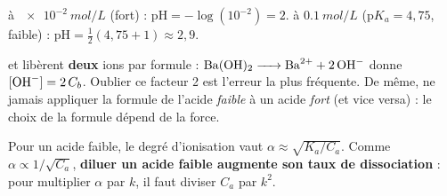 \documentclass[11pt,a4paper]{article}
\begin{document}
\begin{exemplebox}
 à $\qty{e-2}{mol\per L}$ (fort) : $\mathrm{pH} = -\log(10^{-2}) = 2$.\quad\quad
{} à $\qty{0,1}{mol\per L}$ ($\mathrm{p}K_a = 4{,}75$, faible) :
$\mathrm{pH} = \tfrac12(4{,}75 + 1) \approx 2{,}9$.
\end{exemplebox}

\begin{piege}
 et  libèrent \textbf{deux} ions par formule :
$\ce{Ba(OH)2 -> Ba^{2+} + 2 OH-}$ donne $[\ce{OH-}] = 2\,C_b$. Oublier ce facteur \num{2} est l'erreur la plus
fréquente. De même, ne jamais appliquer la formule de l'acide \emph{faible} à un acide \emph{fort} (et vice
versa) : le choix de la formule dépend de la force.
\end{piege}

\begin{remarque}
Pour un acide faible, le degré d'ionisation vaut $\alpha \approx \sqrt{K_a/C_a}$. Comme $\alpha \propto
1/\sqrt{C_a}$, \textbf{diluer un acide faible augmente son taux de dissociation} : pour multiplier $\alpha$ par
$k$, il faut diviser $C_a$ par $k^2$.
\end{remarque}
\end{document}
